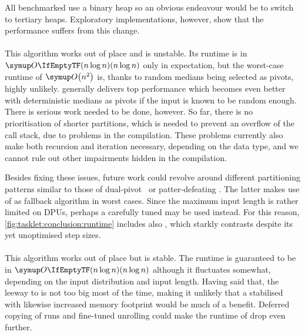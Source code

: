 All benchmarked \HS*{} use a binary heap so an obvious endeavour would be to switch to tertiary heaps.
Exploratory implementations, however, show that the performance suffers from this change.


\paragraph{\QS{}}
This algorithm works out of place and is unstable.
Its runtime is in \(\bigoh{n \log n}\) only in expectation, but the worst-case runtime of \(\bigoh*{n^2}\) is, thanks to random medians being selected as pivots, highly unlikely.
\QS{} generally delivers top performance which becomes even better with deterministic medians as pivots if the input is known to be random enough.
There is serious work needed to be done, however.
So far, there is no prioritisation of shorter partitions, which is needed to prevent an overflow of the call stack, due to problems in the compilation.
These problems currently also make both recursion and iteration necessary, depending on the data type, and we cannot rule out other impairments hidden in the compilation.

Besides fixing these issues, future work could revolve around different partitioning patterns similar to those of dual-pivot~\cite{wild2012averagecase} or patter-defeating \QS{}.
The latter makes use of \HS{} as fallback algorithm in worst cases.
Since the maximum input length is rather limited on \acp{DPU}, perhaps a carefully tuned \ShS{} may be used instead.
For this reason, \cref{fig:tasklet:conclusion:runtime} includes also \ShS{}, which starkly contrasts \HS{} despite its yet unoptimised step sizes.


\paragraph{\MS{}}
This algorithm  works out of place but is stable.
The runtime is guaranteed to be in \(\bigoh{n \log n}\) although it fluctuates somewhat, depending on the input distribution and input length.
Having said that, the leeway to \QS{} is not too big most of the time, making it unlikely that a stabilised \QS{} with likewise increased memory footprint would be much of a benefit.
Deferred copying of runs and fine-tuned unrolling could make the runtime of \MS{} drop even further.

